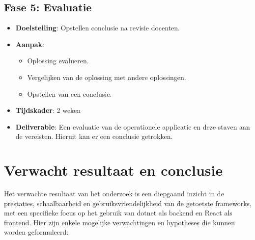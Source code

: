 \documentclass{hogent-article}
\begin{document}
\subsection*{Fase 5: Evaluatie}
\begin{itemize}
\item \textbf{Doelstelling}: Opstellen conclusie na revisie docenten.
\item \textbf{Aanpak}:
\begin{itemize}
\item Oplossing evalueren.
\item Vergelijken van de oplossing met andere oplossingen.
\item Opstellen van een conclusie.
\end{itemize}
\item \textbf{Tijdskader}: 2 weken
\item \textbf{Deliverable}: Een evaluatie van de operationele applicatie en deze staven aan de vereisten. Hieruit kan er een conclusie getrokken.
\end{itemize}


\pagebreak
\section{Verwacht resultaat en conclusie}%
\label{sec:verwachte_resultaten}
Het verwachte resultaat van het onderzoek is een diepgaand inzicht in de pre\-sta\-ties, schaalbaarheid en gebruiksvriendelijkheid van de getoetste frameworks, met een specifieke focus op het gebruik van dotnet als backend en React als frontend. Hier zijn enkele mogelijke verwachtingen en hypotheses die kunnen worden geformuleerd:
\end{document}
